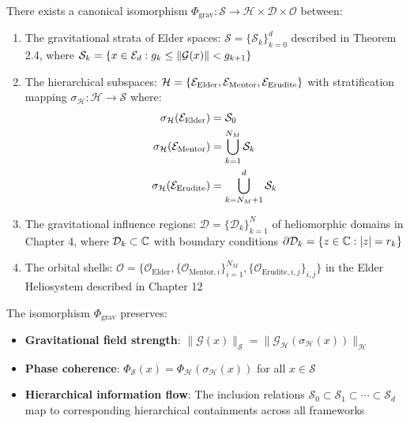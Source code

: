\begin{theorem}
\label{thm:gravitational_stratification}
There exists a canonical isomorphism $\Phi_{\text{grav}}: \mathcal{S} \rightarrow \mathcal{H} \times \mathcal{D} \times \mathcal{O}$ between:
\begin{enumerate}
    \item The gravitational strata of Elder spaces: $\mathcal{S} = \{\mathcal{S}_k\}_{k=0}^{d}$ described in Theorem 2.4, where $\mathcal{S}_k = \{x \in \mathcal{E}_{d} : g_k \leq \|\mathcal{G}(x)\| < g_{k+1}\}$
    
    \item The hierarchical subspaces: $\mathcal{H} = \{\mathcal{E}_{\text{Elder}}, \mathcal{E}_{\text{Mentor}}, \mathcal{E}_{\text{Erudite}}\}$ with stratification mapping $\sigma_{\mathcal{H}}: \mathcal{H} \rightarrow \mathcal{S}$ where:
    \begin{align}
        \sigma_{\mathcal{H}}(\mathcal{E}_{\text{Elder}}) &= \mathcal{S}_0 \\
        \sigma_{\mathcal{H}}(\mathcal{E}_{\text{Mentor}}) &= \bigcup_{k=1}^{N_M} \mathcal{S}_k \\
        \sigma_{\mathcal{H}}(\mathcal{E}_{\text{Erudite}}) &= \bigcup_{k=N_M+1}^{d} \mathcal{S}_k
    \end{align}
    
    \item The gravitational influence regions: $\mathcal{D} = \{\mathcal{D}_k\}_{k=1}^N$ of heliomorphic domains in Chapter 4, where $\mathcal{D}_k \subset \mathbb{C}$ with boundary conditions $\partial\mathcal{D}_k = \{z \in \mathbb{C} : |z| = r_k\}$
    
    \item The orbital shells: $\mathcal{O} = \{\mathcal{O}_{\text{Elder}}, \{\mathcal{O}_{\text{Mentor},i}\}_{i=1}^{N_M}, \{\mathcal{O}_{\text{Erudite},i,j}\}_{i,j}\}$ in the Elder Heliosystem described in Chapter 12
\end{enumerate}

The isomorphism $\Phi_{\text{grav}}$ preserves:
\begin{itemize}
    \item \textbf{Gravitational field strength}: $\|\mathcal{G}(x)\|_{\mathcal{S}} = \|\mathcal{G}_{\mathcal{H}}(\sigma_{\mathcal{H}}(x))\|_{\mathcal{H}}$
    \item \textbf{Phase coherence}: $\Phi_{\mathcal{S}}(x) = \Phi_{\mathcal{H}}(\sigma_{\mathcal{H}}(x))$ for all $x \in \mathcal{S}$
    \item \textbf{Hierarchical information flow}: The inclusion relations $\mathcal{S}_0 \subset \mathcal{S}_1 \subset \cdots \subset \mathcal{S}_d$ map to corresponding hierarchical containments across all frameworks
\end{itemize}
\end{theorem}

